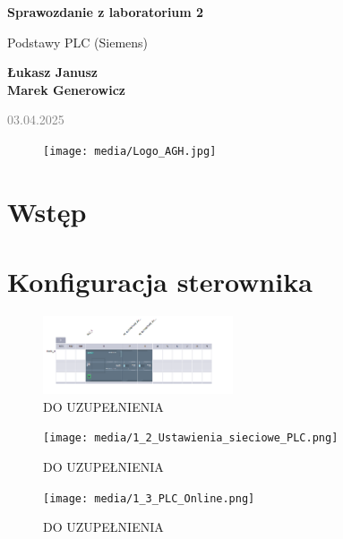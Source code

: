 \documentclass{article}
\begin{document}
\begin{titlepage}
    \begin{center}
        \vspace*{1cm}
            
        \Huge
        \textbf{Sprawozdanie z laboratorium 2}
            
        \vspace{0.5cm}
        \LARGE
        Podstawy PLC (Siemens) 
            
        \vspace{1.5cm}
            
        \textbf{Łukasz Janusz\\Marek Generowicz}

        \normalsize      
        \textcolor{gray}{03.04.2025}
        \vfill
        \begin{figure}[hb]
            \centering
            \texttt{[image: media/Logo\_AGH.jpg]}
        \end{figure}   
    \end{center}
\end{titlepage}

\newpage
\section{Wstęp}

\section{Konfiguracja sterownika}

\begin{figure}[H]
    \centering
    \includegraphics[width=0.5\textwidth]{media/1_1_Dodanie_modułu.png}
    \caption{DO UZUPEŁNIENIA}
    \label{fig:zdj1}
\end{figure}

\begin{figure}[H]
    \centering
    \texttt{[image: media/1\_2\_Ustawienia\_sieciowe\_PLC.png]}
    \caption{DO UZUPEŁNIENIA}
    \label{fig:zdj2}
\end{figure}

\begin{figure}[H]
    \centering
    \texttt{[image: media/1\_3\_PLC\_Online.png]}
    \caption{DO UZUPEŁNIENIA}
    \label{fig:zdj3}
\end{figure}
\end{document}
